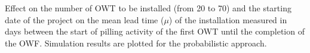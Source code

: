 \label{fig:effectnumber}
Effect on the number of OWT to be installed (from 20 to 70) and the starting date of the project on the mean lead time ($\mu$) of the installation measured in days between the start of pilling activity of the first OWT until the completion of the OWF. Simulation results are plotted for the probabilistic approach.